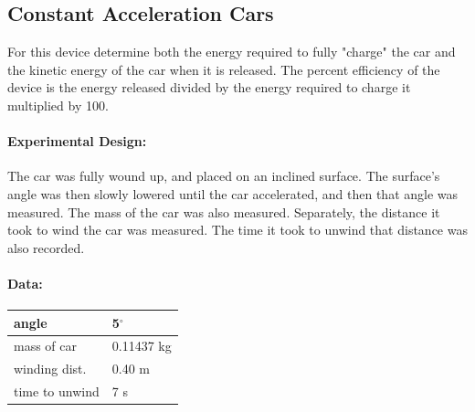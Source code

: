\documentclass[12pt]{article}
\begin{document}
	
	\subsection{Constant Acceleration Cars}
	For this device determine both the energy required to fully "charge" the car and the kinetic energy of the car when it is released. The percent efficiency of the device is the energy released divided by the energy required to charge it multiplied by 100.
	\paragraph{Experimental Design:} The car was fully wound up, and placed on an inclined surface. The surface's angle was then slowly lowered until the car accelerated, and then that angle was measured. The mass of the car was also measured. Separately, the distance it took to wind the car was measured. The time it took to unwind that distance was also recorded.
	\paragraph{Data:}
	\begin{flushleft}
	\begin{tabular}{ l|l }
		angle & 5$^{\circ}$ \\
		\hline
		mass of car & 0.11437 kg \\
		\hline
		winding dist. & 0.40 m \\
		\hline
		time to unwind & 7 s \\
	\end{tabular}
	\end{flushleft}
\end{document}
